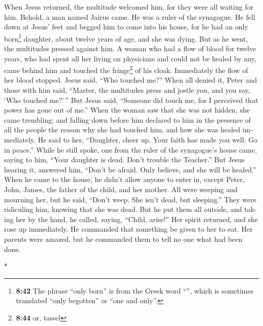 \begin{paracol}{2}
\begin{otherlanguage}{english}
 When Jesus returned, the multitude welcomed him, for
they were all waiting for him.  Behold, a man named
Jairus came. He was a ruler of the synagogue. He fell down at Jesus'
feet and begged him to come into his house,  for he had
an only born\footnote{\textbf{8:42} The phrase ``only born'' is from the
  Greek word ``'', which is sometimes translated ``only
  begotten'' or ``one and only''.} daughter, about twelve years of age,
and she was dying. But as he went, the multitudes pressed against him.
 A woman who had a flow of blood for twelve years, who
had spent all her living on physicians and could not be healed by any,
 came behind him and touched the fringe\footnote{\textbf{8:44}
  or, tassel} of his cloak. Immediately the flow of her blood stopped.
 Jesus said, ``Who touched me?'' When all denied it,
Peter and those with him said, ``Master, the multitudes press and jostle
you, and you say, `Who touched me?'\,''  But Jesus said,
``Someone did touch me, for I perceived that power has gone out of me.''
 When the woman saw that she was not hidden, she came
trembling; and falling down before him declared to him in the presence
of all the people the reason why she had touched him, and how she was
healed immediately.  He said to her, ``Daughter, cheer
up. Your faith has made you well. Go in peace.''  While
he still spoke, one from the ruler of the synagogue's house came, saying
to him, ``Your daughter is dead. Don't trouble the Teacher.''
 But Jesus hearing it, answered him, ``Don't be afraid.
Only believe, and she will be healed.''  When he came to
the house, he didn't allow anyone to enter in, except Peter, John,
James, the father of the child, and her mother.  All were
weeping and mourning her, but he said, ``Don't weep. She isn't dead, but
sleeping.''  They were ridiculing him, knowing that she
was dead.  But he put them all outside, and taking her by
the hand, he called, saying, ``Child, arise!''  Her
spirit returned, and she rose up immediately. He commanded that
something be given to her to eat.  Her parents were
amazed, but he commanded them to tell no one what had been done.

\end{otherlanguage}

\switchcolumn[0]*

\hypertarget{enviar-a-los-doce-discuxedpulos-y-darles-instrucciones}{%
}
\end{paracol}
